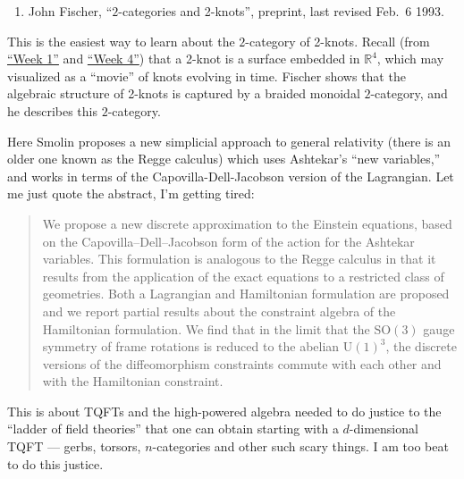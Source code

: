 \documentclass[12pt]{article}
\def\tightlist{}
\renewcommand{\texttt}[1]{%
  \begingroup
  \ttfamily
  \begingroup\lccode`~=`/\lowercase{\endgroup\def~}{/\discretionary{}{}{}}%
  \begingroup\lccode`~=`[\lowercase{\endgroup\def~}{[\discretionary{}{}{}}%
  \begingroup\lccode`~=`.\lowercase{\endgroup\def~}{.\discretionary{}{}{}}%
  \catcode`/=\active\catcode`[=\active\catcode`.=\active
  \scantokens{#1\noexpand}%
  \endgroup
}
\begin{document}
\begin{enumerate}
\def\labelenumi{\arabic{enumi})}
\setcounter{enumi}{1}
\tightlist
\item
  John Fischer, ``\(2\)-categories and 2-knots'', preprint, last
  revised Feb.~6 1993. 
\end{enumerate}
\noindent
This is the easiest way to learn about the \(2\)-category of 2-knots.
Recall (from \protect\hyperlink{week1}{``Week 1''} and
\protect\hyperlink{week4}{``Week 4''}) that a 2-knot is a surface
embedded in \(\mathbb{R}^4\), which may visualized as a ``movie'' of
knots evolving in time. Fischer shows that the algebraic structure of
2-knots is captured by a braided monoidal \(2\)-category, and he
describes this \(2\)-category.

\noindent
Here Smolin proposes a new simplicial approach to general relativity
(there is an older one known as the Regge calculus) which uses
Ashtekar's ``new variables,'' and works in terms of the
Capovilla-Dell-Jacobson version of the Lagrangian. Let me just quote the
abstract, I'm getting tired:

\begin{quote}

We propose a new discrete approximation to the Einstein equations, based
on the Capovilla--Dell--Jacobson form of the action for the Ashtekar
variables. This formulation is analogous to the Regge calculus in that
it results from the application of the exact equations to a restricted
class of geometries. Both a Lagrangian and Hamiltonian formulation are
proposed and we report partial results about the constraint algebra of
the Hamiltonian formulation. We find that in the limit that the
\(\mathrm{SO}(3)\) gauge symmetry of frame rotations is reduced to the
abelian \(\mathrm{U}(1)^3\), the discrete versions of the diffeomorphism
constraints commute with each other and with the Hamiltonian constraint.

\end{quote}

\noindent
This is about TQFTs and the high-powered algebra needed to do justice to
the ``ladder of field theories'' that one can obtain starting with a
\(d\)-dimensional TQFT --- gerbs, torsors, \(n\)-categories and other such
scary things. I am too beat to do this justice.
\end{document}
